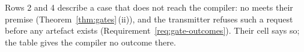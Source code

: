 
Rows 2 and 4 describe a case that does not reach the compiler: no
 meets their premise (Theorem~\ref{thm:gates}\,(ii)), and the
transmitter refuses such a request before any artefact exists
(Requirement~\ref{req:gate-outcomes}). Their cell says so; the table gives
the compiler no outcome there.

